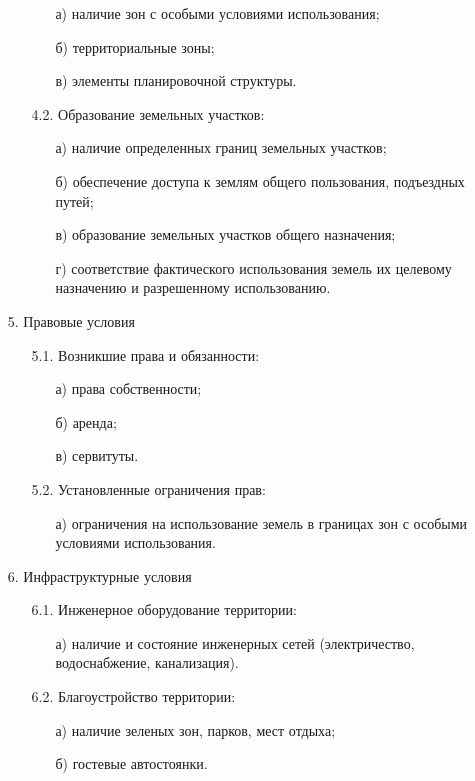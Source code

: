\begin{enumerate}
\begin{enumerate}
        \begin{enumerate}
            \item[а)] наличие зон с особыми условиями использования;
            \item[б)] территориальные зоны;
            \item[в)] элементы планировочной структуры.
        \end{enumerate}
        \item[4.2.] Образование земельных участков:
        \begin{enumerate}
            \item[а)] наличие определенных границ земельных участков;
            \item[б)] обеспечение доступа к землям общего пользования, подъездных путей;
            \item[в)] образование земельных участков общего назначения;
            \item[г)] соответствие фактического использования земель их целевому назначению и разрешенному использованию.
        \end{enumerate}
    \end{enumerate}
    \item[5.] Правовые условия
    \begin{enumerate}
        \item[5.1.] Возникшие права и обязанности:
        \begin{enumerate}
            \item[а)] права собственности;
            \item[б)] аренда;
            \item[в)] сервитуты.
        \end{enumerate}
        \item[5.2.] Установленные ограничения прав:
        \begin{enumerate}
            \item[а)] ограничения на использование земель в границах зон с особыми условиями использования.
        \end{enumerate}
    \end{enumerate}
    \item[6.] Инфраструктурные условия
    \begin{enumerate}
        \item[6.1.] Инженерное оборудование территории:
        \begin{enumerate}
            \item[а)] наличие и состояние инженерных сетей (электричество, водоснабжение, канализация).
        \end{enumerate}
        \item[6.2.] Благоустройство территории:
        \begin{enumerate}
            \item[а)] наличие зеленых зон, парков, мест отдыха;
            \item[б)] гостевые автостоянки.
        \end{enumerate}
    \end{enumerate}
\end{enumerate}

